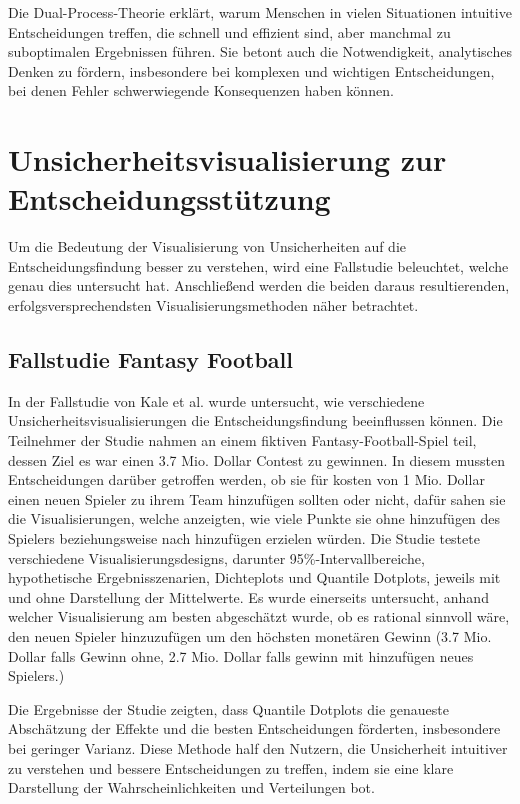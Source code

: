 Die Dual-Process-Theorie erklärt, warum Menschen in vielen Situationen intuitive Entscheidungen treffen, die schnell und effizient 
sind, aber manchmal zu suboptimalen Ergebnissen führen. Sie betont auch die Notwendigkeit, analytisches Denken zu fördern, 
insbesondere bei komplexen und wichtigen Entscheidungen, bei denen Fehler schwerwiegende Konsequenzen haben können.


\section{Unsicherheitsvisualisierung zur Entscheidungsstützung}

Um die Bedeutung der Visualisierung von Unsicherheiten auf die Entscheidungsfindung besser zu verstehen, wird eine Fallstudie beleuchtet, 
welche genau dies untersucht hat. Anschließend werden die beiden daraus resultierenden, erfolgsversprechendsten Visualisierungsmethoden 
näher betrachtet.

\subsection{Fallstudie Fantasy Football}

In der Fallstudie von Kale et al. wurde untersucht, wie verschiedene Unsicherheitsvisualisierungen die Entscheidungsfindung beeinflussen 
können. Die Teilnehmer der Studie nahmen an einem fiktiven Fantasy-Football-Spiel teil, dessen Ziel es war einen 3.7 Mio. Dollar Contest zu gewinnen.
In diesem mussten Entscheidungen darüber getroffen werden, ob sie für kosten von 1 Mio. Dollar einen neuen Spieler zu ihrem Team hinzufügen sollten oder nicht, dafür sahen sie die Visualisierungen,
welche anzeigten, wie viele Punkte sie ohne hinzufügen des Spielers beziehungsweise nach hinzufügen erzielen würden. 
Die Studie testete verschiedene Visualisierungsdesigns, darunter 95\%-Intervallbereiche, hypothetische Ergebnisszenarien, Dichteplots und Quantile Dotplots, 
jeweils mit und ohne Darstellung der Mittelwerte. Es wurde einerseits untersucht, anhand welcher Visualisierung am besten abgeschätzt wurde,
ob es rational sinnvoll wäre, den neuen Spieler hinzuzufügen um den höchsten monetären Gewinn (3.7 Mio. Dollar falls Gewinn ohne, 2.7 Mio. Dollar
falls gewinn mit hinzufügen neues Spielers.)


Die Ergebnisse der Studie zeigten, dass Quantile Dotplots die genaueste Abschätzung der Effekte und die besten Entscheidungen förderten, 
insbesondere bei geringer Varianz. Diese Methode half den Nutzern, die Unsicherheit intuitiver zu verstehen und bessere Entscheidungen 
zu treffen, indem sie eine klare Darstellung der Wahrscheinlichkeiten und Verteilungen bot. \cite{Kale2021}

